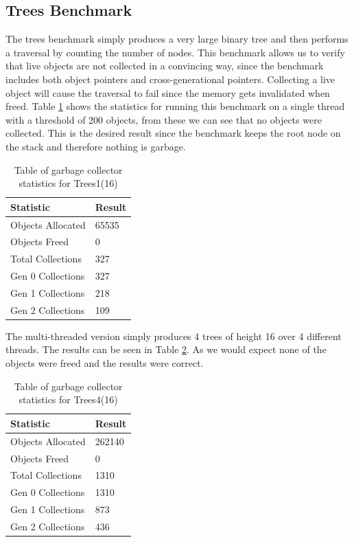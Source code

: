 \documentclass[../diss.tex]{subfiles}
\begin{document}
\subsection{Trees Benchmark}

The trees benchmark simply produces a very large binary tree and then performs a traversal by counting the number of nodes. This benchmark allows us to verify that live objects are not collected in a convincing way, since the benchmark includes both object pointers and cross-generational pointers. Collecting a live object will cause the traversal to fail since the memory gets invalidated when freed. Table \ref{tab:trees1stats} shows the statistics for running this benchmark on a single thread with a threshold of 200 objects, from these we can see that no objects were collected. This is the desired result since the benchmark keeps the root node on the stack and therefore nothing is garbage.

\begin{table}
    \centering
    \begin{tabular}{| l | l |}
        \hline
         \bf{Statistic} & \bf{Result} \\ \hline
         Objects Allocated & 65535 \\ \hline
         Objects Freed & 0 \\ \hline
         Total Collections & 327 \\ \hline
         Gen 0 Collections & 327 \\ \hline
         Gen 1 Collections & 218 \\ \hline
         Gen 2 Collections & 109 \\ \hline
    \end{tabular}
    \caption{Table of garbage collector statistics for Trees1(16)}
    \label{tab:trees1stats}
\end{table}

The multi-threaded version simply produces 4 trees of height 16 over 4 different threads. The results can be seen in Table \ref{tab:treesnstats}. As we would expect none of the objects were freed and the results were correct.

\begin{table}
    \centering
    \begin{tabular}{| l | l |}
        \hline
         \bf{Statistic} & \bf{Result} \\ \hline
         Objects Allocated & 262140 \\ \hline
         Objects Freed & 0 \\ \hline
         Total Collections & 1310 \\ \hline
         Gen 0 Collections & 1310 \\ \hline
         Gen 1 Collections & 873 \\ \hline
         Gen 2 Collections & 436 \\ \hline
    \end{tabular}
    \caption{Table of garbage collector statistics for Trees4(16)}
    \label{tab:treesnstats}
\end{table}
\end{document}
